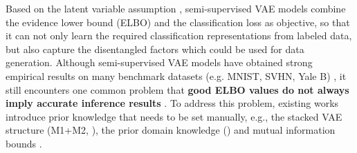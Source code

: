 \documentclass[letterpaper]{article}
\begin{document}
Based on the latent variable assumption \citep{DBLP:journals/corr/Doersch16}, semi-supervised VAE models combine the evidence lower bound (ELBO) and the classification loss as objective, so that it can not only learn the required classification representations from labeled data, but also capture the disentangled factors which could be used for data generation. Although semi-supervised VAE models have obtained strong empirical results on many benchmark datasets (e.g. MNIST, SVHN, Yale B) \citep{DBLP:conf/nips/NarayanaswamyPM17}, it still encounters one common problem that \textbf{good ELBO values do not always imply accurate inference results} \citep{DBLP:journals/corr/ZhaoSE17b}. To address this problem, existing works introduce prior knowledge that needs to be set manually, e.g., the stacked VAE structure (M1+M2, \citealt{DBLP:conf/nips/KingmaMRW14,DBLP:conf/uai/DavidsonFCKT18}), the prior domain knowledge (\citealt{DBLP:journals/corr/LouizosSLWZ15, DBLP:conf/iclr/IlseTLW19}) and mutual information bounds \citep{DBLP:conf/nips/Dupont18}. 
\end{document}
